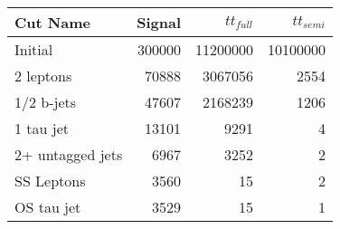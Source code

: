 \begin{tabular}{lrrr}
\toprule
         Cut Name &  Signal &  $tt_{full}$ &  $tt_{semi}$ \\
\midrule
          Initial &  300000 &     11200000 &     10100000 \\
        2 leptons &   70888 &      3067056 &         2554 \\
       1/2 b-jets &   47607 &      2168239 &         1206 \\
        1 tau jet &   13101 &         9291 &            4 \\
 2+ untagged jets &    6967 &         3252 &            2 \\
       SS Leptons &    3560 &           15 &            2 \\
       OS tau jet &    3529 &           15 &            1 \\
\bottomrule
\end{tabular}
